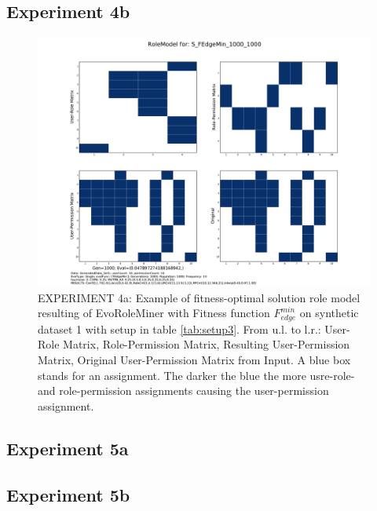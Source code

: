 \subsection{Experiment 4b}
	\begin{figure}[H]
		\centering
		\includegraphics[scale=0.37, trim=4cm 2cm 4cm 2cm, clip=true]{./Figures/exp4bEdge_RM}
		\caption{EXPERIMENT 4a: Example of fitness-optimal solution role model resulting of EvoRoleMiner with Fitness function $F_{edge}^{min}$ on synthetic dataset 1 with setup in table \ref{tab:setup3}. From u.l. to l.r.: User-Role Matrix, Role-Permission Matrix, Resulting User-Permission Matrix, Original User-Permission Matrix from Input. A blue box stands for an assignment. The darker the blue the more usre-role- and role-permission assignments causing the user-permission assignment.}
		\label{fig:exp4bEdge_RM}
	\end{figure}


\subsection{Experiment 5a}

\subsection{Experiment 5b}